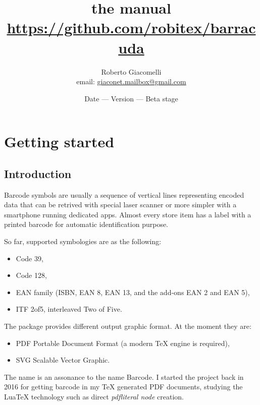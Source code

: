 \documentclass[11pt,a4paper]{article}
\author{Roberto Giacomelli\\\small email: \url{giaconet.mailbox@gmail.com}}
\title{the \code{barracuda} manual\\[1ex]
\small \url{https://github.com/robitex/barracuda}}
\date{\small Date \brcdkey{date} --- Version \brcdkey{version} --- Beta stage}
\begin{document}
\maketitle


\tableofcontents
\newpage


\section{Getting started}
\label{secStart}

\subsection{Introduction}
\label{secIntro}

Barcode symbols are usually a sequence of vertical lines representing encoded
data that can be retrived with special laser scanner or more simpler with a
smartphone running dedicated apps. Almost every store item has a label with a
printed barcode for automatic identification purpose.

So far, \brcd{} supported symbologies are as the following:
\begin{itemize}
	\item Code 39,
	\item Code 128,
	\item EAN family (ISBN, EAN 8, EAN 13, and the add-ons EAN 2 and EAN 5),
	\item ITF 2of5, interleaved Two of Five.
\end{itemize}

The package provides different output graphic format. At the moment they are:
\begin{itemize}
	\item PDF Portable Document Format (a modern \TeX{} engine is required),
	\item SVG Scalable Vector Graphic.
\end{itemize}

The name \brcd{} is an assonance to the name Barcode. I started the project back
in 2016 for getting barcode in my \TeX{} generated PDF documents, studying the
Lua\TeX{} technology such as direct \emph{pdfliteral node} creation.
\end{document}
